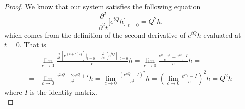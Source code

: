 \documentclass{article}
\begin{document}
\begin{proof}
We know that our system satisfies the following equation
\begin{equation} \label{eq:kol_forw_2}
\frac{\partial^{2}}{\partial^{2} t}\bigl[e^{tQ}h\bigr]\Big\vert_{t=0}=Q^{2} h.
\end{equation}
which comes from the definition of the second derivative of $e^{t Q}h$ evaluated at $t=0$.
That is 
\begin{equation*}
\begin{split}
&\lim_{c\to0}\frac{\frac{\partial}{\partial t}[e^{(t+c)Q}]\Big\vert_{t=0}-\frac{\partial}{\partial t}[e^{tQ}]\Big\vert_{t=0}}{c}h=
\lim_{c\to0}\frac{\frac{e^{2c}-e^{c}}{c}-\frac{e^{2c}-I}{c}}{c}h=\\
=&\lim_{c\to0}{\frac{e^{2cQ}-2e^{cQ}+I}{c^{2}}h}=\lim_{c\to0}\frac{(e^{cQ}-I)^{2}}{c^{2}}h=(\lim_{c\to0}\frac{e^{cQ}-I}{c})^{2}h=Q^{2}h
\end{split}
\end{equation*}
where $I$ is the identity matrix.\\


\end{proof}
\end{document}
